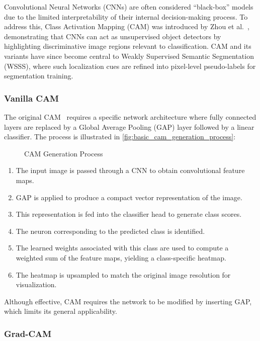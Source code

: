 Convolutional Neural Networks (CNNs) are often considered “black-box” models due to the limited interpretability of their internal decision-making process. To address this, Class Activation Mapping (CAM) was introduced by Zhou et al.~\cite{cam}, demonstrating that CNNs can act as unsupervised object detectors by highlighting discriminative image regions relevant to classification. CAM and its variants have since become central to Weakly Supervised Semantic Segmentation (WSSS), where such localization cues are refined into pixel-level pseudo-labels for segmentation training.

\subsubsection{Vanilla CAM}

The original CAM~\cite{cam} requires a specific network architecture where fully connected layers are replaced by a Global Average Pooling (GAP) layer followed by a linear classifier. The process is illustrated in \autoref{fig:basic_cam_generation_process}:

\begin{figure}[htbp]
    \centering
    \caption{CAM Generation Process}
    \label{fig:basic_cam_generation_process}
\end{figure}

\begin{enumerate}
    \item The input image is passed through a CNN to obtain convolutional feature maps.
    \item GAP is applied to produce a compact vector representation of the image.
    \item This representation is fed into the classifier head to generate class scores.
    \item The neuron corresponding to the predicted class is identified.
    \item The learned weights associated with this class are used to compute a weighted sum of the feature maps, yielding a class-specific heatmap.
    \item The heatmap is upsampled to match the original image resolution for visualization.
\end{enumerate}

Although effective, CAM requires the network to be modified by inserting GAP, which limits its general applicability.

\subsubsection{Grad-CAM}
\label{subsec:grad_cam}

